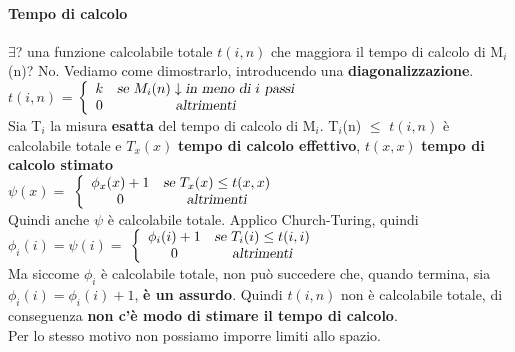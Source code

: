 \documentclass[10pt]{book}
\begin{document}
\paragraph{Tempo di calcolo} $\exists$? una funzione calcolabile totale $t(i, n)$ che maggiora il tempo di calcolo di M$_i$(n)? No. Vediamo come dimostrarlo, introducendo una \textbf{diagonalizzazione}.\\
$t(i, n)$ = \begin{math}
\left\{
\begin{array}{c c}
	k & \textsl{se }M_i(n)\downarrow \textsl{in meno di }i\textsl{ passi}\\
	0 & \textsl{altrimenti}
\end{array}
\right.
\end{math}\\
Sia T$_i$ la misura \textbf{esatta} del tempo di calcolo di M$_i$. T$_i$(n) $\leq$ $t(i, n)$ è calcolabile totale e $T_x(x)$ \textbf{tempo di calcolo effettivo}, $t(x, x)$ \textbf{tempo di calcolo stimato}\\
$\psi(x) = $
\begin{math}
\left\{
\begin{array}{c c}
	\phi_x(x) + 1 & \textsl{se }T_x(x) \leq t(x, x)\\
	0 & \textsl{altrimenti}
\end{array}
\right.
\end{math}\\
Quindi anche $\psi$ è calcolabile totale. Applico Church-Turing, quindi $\phi_i(i) = \psi(i) =$ \begin{math}
\left\{
\begin{array}{c c}
	\phi_i(i) + 1 & \textsl{se }T_i(i) \leq t(i, i)\\
	0 & \textsl{altrimenti}
\end{array}
\right.
\end{math}\\
Ma siccome $\phi_i$ è calcolabile totale, non può succedere che, quando termina, sia $\phi_i(i) = \phi_i(i) + 1$, \textbf{è un assurdo}. Quindi $t(i, n)$ non è calcolabile totale, di conseguenza \textbf{non c'è modo di stimare il tempo di calcolo}.\\
Per lo stesso motivo non possiamo imporre limiti allo spazio.
\end{document}
